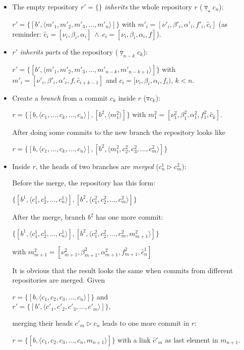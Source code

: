\documentclass[fleqn, 10pt, a4paper]{article}
\begin{document}
\begin{itemize}
\item The empty repository $r'=\{\}$ \emph{inherits} the whole repository $r$
($\underline\triangledown_\star c_n$):

$r' = \{[b', \langle m'_1, m'_2, m'_3, \ldots, m'_n\rangle]\}$ with
$m'_i = [\nu'_i, \beta'_i, \alpha'_i, f'_i, \hat c_i]$ (as reminder:
$\hat c_i = [\nu_i, \beta_i, \alpha_i]\ \wedge\ c_i=[\nu_i, \beta_i, \alpha_i, f]$).

\item $r'$ \emph{inherits parts} of the repository ($\underline\triangledown_
{n-k}c_k$):

$r'=\{[b', \langle m'_1, m'_2, m'_3, \ldots, m'_{n-k}, m'_{n-k+1}\rangle]\}$ with
$m'_i=[\nu'_i, \beta'_i, \alpha'_i, f, \hat c_{i+k-1}]$ and
$c_{i}=[\nu_i, \beta_i, \alpha_i, f_i)$, $k<n$.

\item Create a \emph{branch} from a commit $c_k$ inside $r$
($\triangledown c_k$):

$r = \{[b, \langle c_1, \ldots, c_k, \ldots, c_n\rangle], [b^2, \langle m_1^2
\rangle]\}$ with $m_1^2=[\nu_1^2, \beta_1^2, \alpha_1^2, f_1^2, \hat c_k]$.

After doing some commits to the new branch the repository looks like

$r = \{[b, \langle c_1, \ldots, c_k, \ldots, c_n\rangle], [b^2, \langle m_1^2,
c_2^2, c_3^2, \ldots, c_m^2\rangle ]\}$

\item Inside $r$, the heads of two branches are \emph{merged}
($c_n^1 \rhd
 c_m^2$):

Before the merge, the repository has this form:

$\{[b^1, \langle c_1^1, c_2^1, \ldots, c_n^1\rangle],
[b^2, \langle c_1^2, c_2^2, \ldots, c_m^2\rangle]\}$	

After the merge, branch $b^2$ has one more commit:

$\{[b^1, \langle c_1^1, c_2^1, \ldots, c_n^1\rangle],
[b^2, \langle c_1^2, c_2^2, \ldots, c_m^2, m_{m+1}^2\rangle]\}$

with $m_{m+1}^2=[\nu_{m+1}^2, \beta_{m+1}^2, \alpha_{m+1}^2, f_{m+1}^2,
\hat c_n^1]$

It is obvious that the result looks the same when commits
from different repositories are merged. Given

$r = \{[b, \langle c_1, c_2, c_3, \ldots, c_n\rangle]\}$ and \\
$r' = \{[b', \langle c'_1, c'_2, c'_3, \ldots, c'_m\rangle]\}$,

merging their heads $c'_m \rhd c_n$ leads to one more commit in
$r$:

$r = \{[b, \langle c_1, c_2, c_3, \ldots, c_n, m_{n+1}\rangle]\}$
with a link $\hat c'_m$ as last element in $m_{n+1}$.
\end{itemize}
\end{document}

